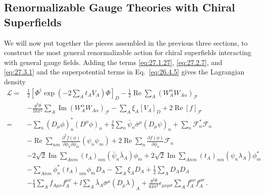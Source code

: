 
\subsection{Renormalizable Gauge Theories with Chiral Superfields}

We will now put together the pieces assembled in the previous three sections,
to construct the most general renormalizable action for chiral superfields
interacting with general gauge fields. Adding the terms
\eqref{eq:27.1.27}, \eqref{eq:27.2.7}, and \eqref{eq:27.3.1} and the
superpotential terms in Eq.~\eqref{eq:26.4.5} gives the Lagrangian density
\begin{equation}
  \begin{aligned}
  \mathcal{L}={}&
  \frac12\left[
    \Phi^\dagger
    \exp\left(-2\sum_A t_A V_A\right)\Phi
  \right]_D
  -\frac12\operatorname{Re}\sum_A
    \left(W_A^\alpha W_{A\alpha}\right)_{\mathcal{F}}
  \\
  &-\frac{g^2\theta}{16\pi^2}\sum_A
    \operatorname{Im}
    \left(W_A^\alpha W_{A\alpha}\right)_{\mathcal{F}}
  -\sum_A\xi_A[V_A]_D
  +2\operatorname{Re}[f]_{\mathcal{F}}
  \\
  ={}&
  -\sum_n(D_\mu\phi)_n^*(D^\mu\phi)_n
  +\frac{\ii}{2}\sum_n
    \bar\psi_n\bar\sigma^\mu(D_\mu\psi)_n
  +\sum_n\mathcal{F}_n^*\mathcal{F}_n
  \\
  &-\operatorname{Re}\sum_{nm}
    \frac{\partial^2f(\phi)}{\partial\phi_n\partial\phi_m}
    \left(\psi_n\psi_m\right)
  +2\operatorname{Re}\sum_n
    \frac{\partial f(\phi)}{\partial\phi_n}\mathcal{F}_n
  \\
  &-2\sqrt{2}\operatorname{Im}\sum_{Anm}
    (t_A)_{nm}\left(\bar\psi_n\bar\lambda_A\right)\phi_m
  +2\sqrt{2}\operatorname{Im}\sum_{Anm}
    (t_A)_{mn}\left(\psi_n\lambda_A\right)\phi_m^*
  \\
  &-\sum_{Anm}\phi_n^*(t_A)_{nm}\phi_mD_A
  -\sum_A\xi_AD_A
  +\frac12\sum_A D_AD_A
  \\
  &-\frac14\sum_A f_{A\mu\nu}f_A^{\mu\nu}
  +\ii\sum_A\bar\lambda_A\bar\sigma^\mu(D_\mu\lambda)_A
  +\frac{g^2\theta}{64\pi^2}\epsilon_{\mu\nu\rho\sigma}
    \sum_Af_A^{\mu\nu}f_A^{\rho\sigma}\,.
  \end{aligned}
  \tag{27.4.1}\label{eq:27.4.1}
\end{equation}
